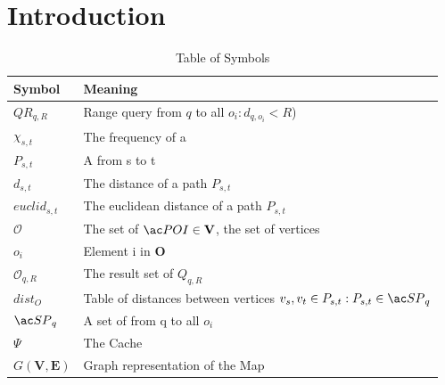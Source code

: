 \section{Introduction} \label{sec:intro}


\begin{table}
\begin{tabular*}{\columnwidth}{|l|p{}|}
\hline
\bf Symbol		& \bf Meaning \\\hline
$QR_{q,R}$		& Range query from $q$ to all $o_i : d_{q,o_i} < R$) \\\hline
$\chi_{s,t}$		& The frequency of a \spath \\\hline
$P_{s,t}$		& A \spath from s to t \\\hline
$d_{s,t}$		& The \spath distance of a path $P_{s,t}$ \\\hline
$euclid_{s,t}$		& The euclidean distance of a path $P_{s,t}$ \\\hline
$\mathcal{O}$		& The set of $\poi \in \mathbf{V}$, the set of vertices\\\hline
$o_i$			& Element i in $\mathbf{O}$ \\\hline
$\mathcal{O}_{q,R}$	& The result set of  $Q_{q,R}$ \\\hline
$dist_O$ 		& Table of distances between vertices $v_s, v_t \in P_{s,t} :  P_{s,t} \in \spath_q$ \\\hline
$\spath_{q}$		& A set of \spath from q to all $o_i$ \\\hline

$\Psi$ 			& The Cache \\\hline
$G\mathbf{(V,E)}$ 	& Graph representation of the Map \\\hline 
\end{tabular*}
\caption{Table of Symbols}
\label{tab:symbols}
\end{table}

